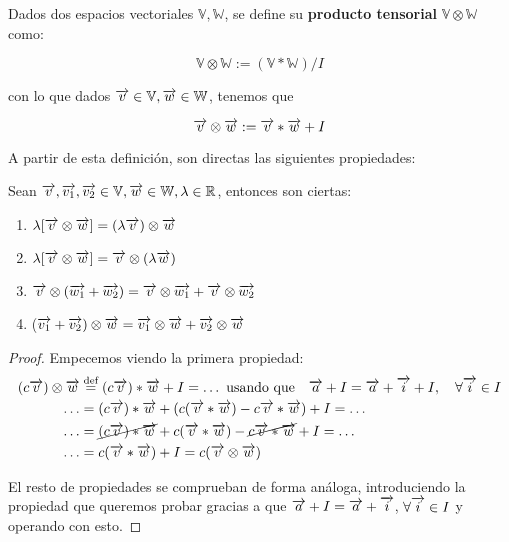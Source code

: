\begin{definicion}
    Dados dos espacios vectoriales $\mathbb{V}, \mathbb{W}$, se define su \textbf{producto tensorial} $\mathbb{V} \otimes \mathbb{W}$ como:

    $$\mathbb{V} \otimes \mathbb{W} := (\mathbb{V} \ast \mathbb{W}) / I$$

    con lo que dados $\overrightarrow{v} \in \mathbb{V}, \overrightarrow{w} \in \mathbb{W}$, tenemos que

    \begin{equation}
        \overrightarrow{v} \otimes \overrightarrow{w} := \overrightarrow{v} \ast \overrightarrow{w} + I
    \end{equation}
\end{definicion}

A partir de esta definición, son directas las siguientes propiedades:

\begin{proposicion} \label{prop:tensores_propiedades}
    Sean $\overrightarrow{v}, \overrightarrow{v_1}, \overrightarrow{v_2} \in \mathbb{V}, \overrightarrow{w} \in \mathbb{W}, \lambda \in \mathbb{R}$, entonces son ciertas:
    \begin{enumerate}
        \item $\lambda [\overrightarrow{v} \otimes \overrightarrow{w}] = (\lambda \overrightarrow{v}) \otimes \overrightarrow{w}$
        \item $\lambda [\overrightarrow{v} \otimes \overrightarrow{w}] = \overrightarrow{v} \otimes (\lambda \overrightarrow{w})$
        \item $\overrightarrow{v} \otimes (\overrightarrow{w_1} + \overrightarrow{w_2}) = \overrightarrow{v} \otimes \overrightarrow{w_1} + \overrightarrow{v} \otimes \overrightarrow{w_2}$
        \item ($\overrightarrow{v_1} + \overrightarrow{v_2}) \otimes \overrightarrow{w} = \overrightarrow{v_1} \otimes \overrightarrow{w} + \overrightarrow{v_2} \otimes \overrightarrow{w}$
    \end{enumerate}
\end{proposicion}

\begin{proof} Empecemos viendo la primera propiedad:
    \begin{equation}
    \begin{split}
        (c\overrightarrow{v}) \otimes \overrightarrow{w} &\stackrel{\text{def}}{=} (c\overrightarrow{v}) \ast \overrightarrow{w} + I = \ldots \ \text{usando que} \quad \overrightarrow{a} + I = \overrightarrow{a} + \overrightarrow{i} + I, \quad \forall \overrightarrow{i} \in I \\
        \ldots &= (c\overrightarrow{v}) \ast \overrightarrow{w} + (c(\overrightarrow{v} \ast \overrightarrow{w}) - c\overrightarrow{v} \ast \overrightarrow{w}) + I = \ldots \\
        \ldots &= \cancel{(c\overrightarrow{v}) \ast \overrightarrow{w}} + c(\overrightarrow{v} \ast \overrightarrow{w}) - \cancel{c\overrightarrow{v} \ast \overrightarrow{w}} + I = \ldots \\
        \ldots &= c(\overrightarrow{v} \ast \overrightarrow{w}) + I = c (\overrightarrow{v} \otimes \overrightarrow{w}) \\
    \end{split}
    \end{equation}

    El resto de propiedades se comprueban de forma análoga, introduciendo la propiedad que queremos probar gracias a que $\overrightarrow{a} + I = \overrightarrow{a} + \overrightarrow{i}$, $\forall \overrightarrow{i} \in I$ y operando con esto.

\end{proof}

